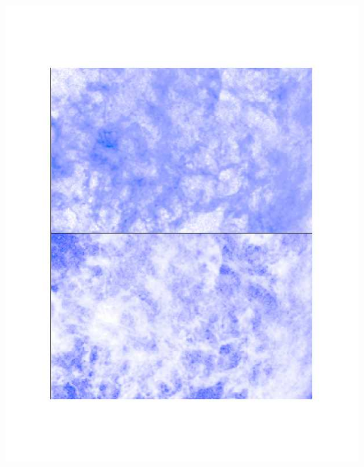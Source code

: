 {{\begin{columns}[t,onlytextwidth]

  \begin{center}
    \includegraphics[width=\textwidth,height=!]{./A/elmegreen_lmc_example_fig10}
  \end{center}



\end{columns}}}
